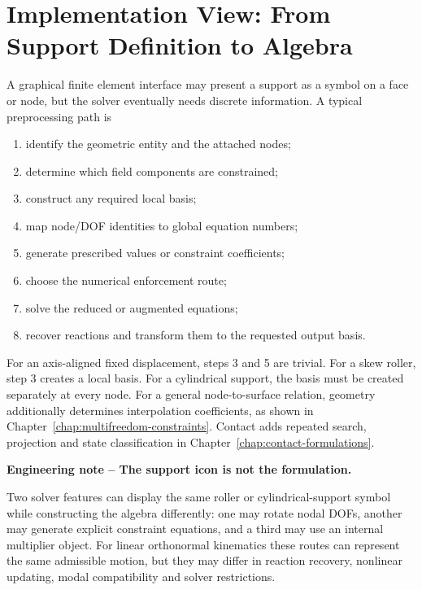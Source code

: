 \section[Implementation View]{Implementation View: From Support Definition to Algebra}

A graphical finite element interface may present a support as a symbol on a
face or node, but the solver eventually needs discrete information. A typical
preprocessing path is

\begin{enumerate}
    \item identify the geometric entity and the attached nodes;
    \item determine which field components are constrained;
    \item construct any required local basis;
    \item map node/DOF identities to global equation numbers;
    \item generate prescribed values or constraint coefficients;
    \item choose the numerical enforcement route;
    \item solve the reduced or augmented equations;
    \item recover reactions and transform them to the requested output basis.
\end{enumerate}

For an axis-aligned fixed displacement, steps 3 and 5 are trivial. For a skew
roller, step 3 creates a local basis. For a cylindrical support, the basis must
be created separately at every node. For a general node-to-surface relation,
geometry additionally determines interpolation coefficients, as shown in
Chapter~\ref{chap:multifreedom-constraints}. Contact adds repeated search,
projection and state classification in Chapter~\ref{chap:contact-formulations}.

\begin{bbox}
\textbf{Engineering note -- The support icon is not the formulation.}

Two solver features can display the same roller or cylindrical-support symbol
while constructing the algebra differently: one may rotate nodal DOFs, another
may generate explicit constraint equations, and a third may use an internal
multiplier object. For linear orthonormal kinematics these routes can represent
the same admissible motion, but they may differ in reaction recovery, nonlinear
updating, modal compatibility and solver restrictions.
\end{bbox}


